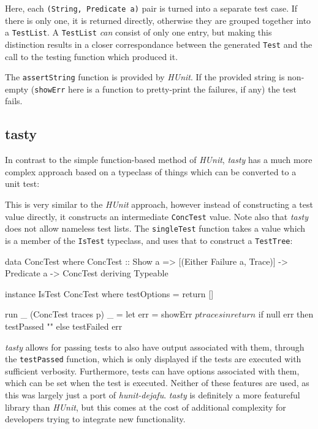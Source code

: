 Here, each \verb|(String, Predicate a)| pair is turned into a separate
test case. If there is only one, it is returned directly, otherwise
they are grouped together into a \verb|TestList|. A \verb|TestList|
\emph{can} consist of only one entry, but making this distinction
results in a closer correspondance between the generated \verb|Test|
and the call to the testing function which produced it.

The \verb|assertString| function is provided by \emph{HUnit}. If the
provided string is non-empty (\verb|showErr| here is a function to
pretty-print the failures, if any) the test fails.

\subsection{tasty}
\label{sec:practice-integration-tasty}

In contrast to the simple function-based method of \emph{HUnit},
\emph{tasty} has a much more complex approach based on a typeclass of
things which can be converted to a unit test:


This is very similar to the \emph{HUnit} approach, however instead of
constructing a test value directly, it constructs an intermediate
\verb|ConcTest| value. Note also that \emph{tasty} does not allow
nameless test lists. The \verb|singleTest| function takes a value
which is a member of the \verb|IsTest| typeclass, and uses that to
construct a \verb|TestTree|:

\begin{haskellcode}
data ConcTest where
  ConcTest :: Show a => [(Either Failure a, Trace)] -> Predicate a -> ConcTest
  deriving Typeable

instance IsTest ConcTest where
  testOptions = return []

  run _ (ConcTest traces p) _ =
    let err = showErr $ p traces
     in return $ if null err then testPassed "" else testFailed err
\end{haskellcode}

\emph{tasty} allows for passing tests to also have output associated
with them, through the \verb|testPassed| function, which is only
displayed if the tests are executed with sufficient
verbosity. Furthermore, tests can have options associated with them,
which can be set when the test is executed. Neither of these features
are used, as this was largely just a port of
\emph{hunit-dejafu}. \emph{tasty} is definitely a more featureful
library than \emph{HUnit}, but this comes at the cost of additional
complexity for developers trying to integrate new functionality.
